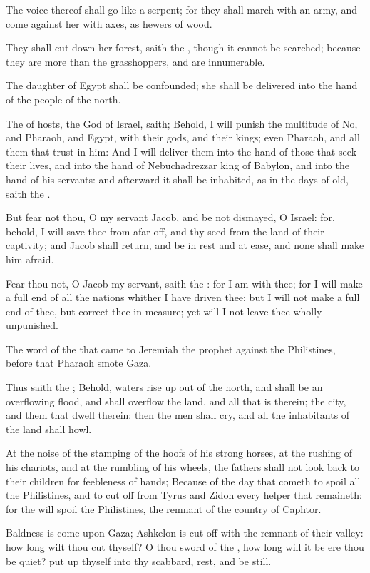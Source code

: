 \Verse The voice thereof shall go like a serpent; for they shall march with an army, and come against her with axes, as hewers of wood.

\Verse They shall cut down her forest, saith the \LORD, though it cannot be searched; because they are more than the grasshoppers, and are innumerable.

\Verse The daughter of Egypt shall be confounded; she shall be delivered into the hand of the people of the north.

\Verse The \LORD of hosts, the God of Israel, saith; Behold, I will punish the multitude of No, and Pharaoh, and Egypt, with their gods, and their kings; even Pharaoh, and all them that trust in him: \Verse And I will deliver them into the hand of those that seek their lives, and into the hand of Nebuchadrezzar king of Babylon, and into the hand of his servants: and afterward it shall be inhabited, as in the days of old, saith the \LORD.

\Verse But fear not thou, O my servant Jacob, and be not dismayed, O Israel: for, behold, I will save thee from afar off, and thy seed from the land of their captivity; and Jacob shall return, and be in rest and at ease, and none shall make him afraid.

\Verse Fear thou not, O Jacob my servant, saith the \LORD: for I am with thee; for I will make a full end of all the nations whither I have driven thee: but I will not make a full end of thee, but correct thee in measure; yet will I not leave thee wholly unpunished.


\Chapter
\Verse The word of the \LORD that came to Jeremiah the prophet against the Philistines, before that Pharaoh smote Gaza.

\Verse Thus saith the \LORD; Behold, waters rise up out of the north, and shall be an overflowing flood, and shall overflow the land, and all that is therein; the city, and them that dwell therein: then the men shall cry, and all the inhabitants of the land shall howl.

\Verse At the noise of the stamping of the hoofs of his strong horses, at the rushing of his chariots, and at the rumbling of his wheels, the fathers shall not look back to their children for feebleness of hands; \Verse Because of the day that cometh to spoil all the Philistines, and to cut off from Tyrus and Zidon every helper that remaineth: for the \LORD will spoil the Philistines, the remnant of the country of Caphtor.

\Verse Baldness is come upon Gaza; Ashkelon is cut off with the remnant of their valley: how long wilt thou cut thyself?  \Verse O thou sword of the \LORD, how long will it be ere thou be quiet? put up thyself into thy scabbard, rest, and be still.

